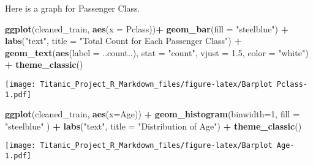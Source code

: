 \documentclass[
]{article}
\newenvironment{Shaded}{\begin{snugshade}}{\end{snugshade}}
\newcommand{\AttributeTok}[1]{\textcolor[rgb]{0.13,0.29,0.53}{#1}}
\newcommand{\DecValTok}[1]{\textcolor[rgb]{0.00,0.00,0.81}{#1}}
\newcommand{\FloatTok}[1]{\textcolor[rgb]{0.00,0.00,0.81}{#1}}
\newcommand{\FunctionTok}[1]{\textcolor[rgb]{0.13,0.29,0.53}{\textbf{#1}}}
\newcommand{\NormalTok}[1]{#1}
\newcommand{\SpecialCharTok}[1]{\textcolor[rgb]{0.81,0.36,0.00}{\textbf{#1}}}
\newcommand{\StringTok}[1]{\textcolor[rgb]{0.31,0.60,0.02}{#1}}
\begin{document}
Here is a graph for Passenger Class.

\begin{Shaded}
\begin{Highlighting}[]
\FunctionTok{ggplot}\NormalTok{(cleaned\_train, }\FunctionTok{aes}\NormalTok{(}\AttributeTok{x =}\NormalTok{ Pclass))}\SpecialCharTok{+} 
  \FunctionTok{geom\_bar}\NormalTok{(}\AttributeTok{fill =} \StringTok{"steelblue"}\NormalTok{) }\SpecialCharTok{+} 
  \FunctionTok{labs}\NormalTok{(}\StringTok{"text"}\NormalTok{, }\AttributeTok{title =} \StringTok{"Total Count for Each Passenger Class"}\NormalTok{) }\SpecialCharTok{+}
  \FunctionTok{geom\_text}\NormalTok{(}\FunctionTok{aes}\NormalTok{(}\AttributeTok{label =}\NormalTok{ ..count..), }\AttributeTok{stat =} \StringTok{"count"}\NormalTok{, }\AttributeTok{vjust =} \FloatTok{1.5}\NormalTok{, }\AttributeTok{color =} \StringTok{"white"}\NormalTok{) }\SpecialCharTok{+}
  \FunctionTok{theme\_classic}\NormalTok{()}
\end{Highlighting}
\end{Shaded}

\texttt{[image: Titanic\_Project\_R\_Markdown\_files/figure-latex/Barplot Pclass-1.pdf]}

\begin{Shaded}
\begin{Highlighting}[]
\FunctionTok{ggplot}\NormalTok{(cleaned\_train, }\FunctionTok{aes}\NormalTok{(}\AttributeTok{x=}\NormalTok{Age)) }\SpecialCharTok{+} 
  \FunctionTok{geom\_histogram}\NormalTok{(}\AttributeTok{binwidth=}\DecValTok{1}\NormalTok{, }\AttributeTok{fill =} \StringTok{"steelblue"}\NormalTok{ ) }\SpecialCharTok{+} 
  \FunctionTok{labs}\NormalTok{(}\StringTok{"text"}\NormalTok{, }\AttributeTok{title =} \StringTok{"Distribution of Age"}\NormalTok{) }\SpecialCharTok{+}
  \FunctionTok{theme\_classic}\NormalTok{()}
\end{Highlighting}
\end{Shaded}

\texttt{[image: Titanic\_Project\_R\_Markdown\_files/figure-latex/Barplot Age-1.pdf]}
\end{document}
